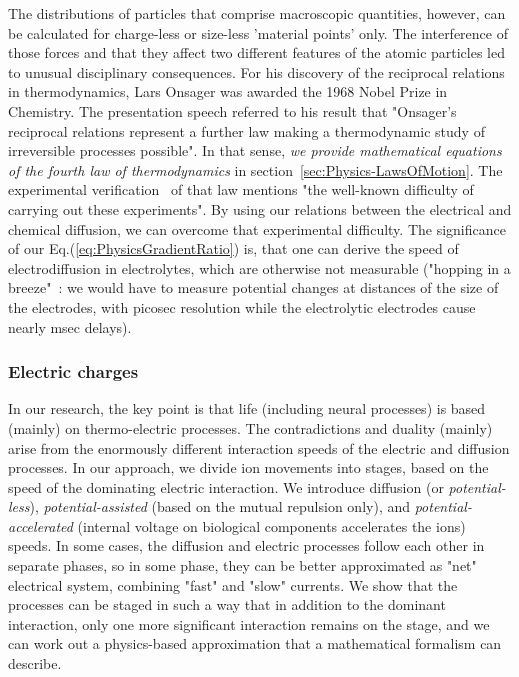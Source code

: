 The distributions of particles that comprise macroscopic quantities, however, can be calculated for charge-less or size-less 'material points' only.
The interference of those forces and that they affect two different 
features of the atomic particles led to unusual disciplinary consequences.
 For his discovery of the \hypertarget{Onsager_relations}{reciprocal relations in thermodynamics},
 Lars Onsager was awarded the 1968 Nobel Prize in Chemistry.
 The presentation speech referred to his result that "Onsager's reciprocal relations represent a further law making a thermodynamic study of irreversible processes possible". In that sense, \textit{we provide mathematical equations of the fourth law of thermodynamics} in section~\ref{sec:Physics-LawsOfMotion}.
The experimental verification~\cite{OnsagerExperimental:1959} of that law mentions "the well-known difficulty of carrying out these experiments". 
By using our relations between the electrical and chemical diffusion, we can overcome that experimental difficulty.
The significance of our Eq.(\ref{eq:PhysicsGradientRatio}) is, that one can derive the speed of 
electrodiffusion in electrolytes, which are otherwise not measurable ("hopping in a breeze"~\cite{KochBiophysics:1999}: we would have to measure potential changes 
at distances of the size of the electrodes, 
with picosec resolution while the electrolytic electrodes 
cause nearly msec delays).


\subsubsection{Electric charges\label{sec:Physics-ThermoElectric}}
In our research, the key point is that life (including neural processes) is based (mainly)
 on \hypertarget{ElectrodiffusionProcesses}{thermo-electric processes}.
The contradictions and duality (mainly) arise from the
enormously different interaction speeds of the electric and diffusion
processes. In our approach, we divide ion movements into stages,
based on the speed of the dominating electric interaction. We introduce
diffusion (or \emph{potential-less}), \emph{potential-assisted} (based
on the mutual repulsion only), and \emph{potential-accelerated} (internal 
voltage on biological components accelerates the ions) speeds. 
In some cases, the diffusion and electric processes follow each other in separate phases, so in some phase, they can be better approximated as "net" electrical system, combining "fast" and "slow" currents.
We show that the processes can
be staged in such a way that in addition to the dominant interaction,
only one more significant interaction remains on the stage, and we can work
out a physics-based approximation that a mathematical formalism can
describe.


